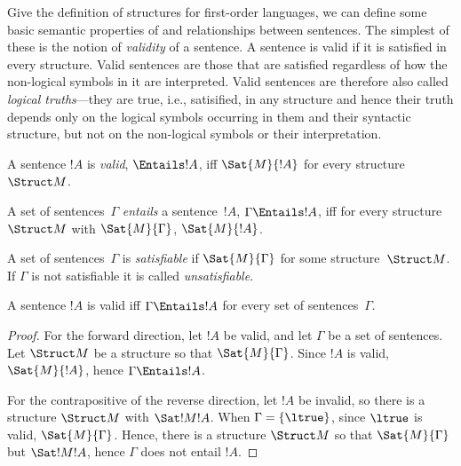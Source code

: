 \documentclass[../../include/open-logic-section]{subfiles}
\begin{document}

\begin{explain}
Give the definition of structures for first-order languages, we can
define some basic semantic properties of and relationships between
sentences.  The simplest of these is the notion of \emph{validity} of
a sentence.  A sentence is valid if it is satisfied in every
structure.  Valid sentences are those that are satisfied regardless of
how the non-logical symbols in it are interpreted.  Valid sentences
are therefore also called \emph{logical truths}---they are true, i.e.,
satisified, in any structure and hence their truth depends only on the
logical symbols occurring in them and their syntactic structure, but not
on the non-logical symbols or their interpretation.  
\end{explain}

\begin{defn}[Validity]
A sentence $!A$ is \emph{valid}, $\Entails !A$, iff $\Sat{M}{!A}$ for every
structure~$\Struct M$.
\end{defn}

\begin{defn}[Entailment]
A set of sentences~$\Gamma$ \emph{entails} a sentence~$!A$, $\Gamma
\Entails !A$, iff for every structure~$\Struct M$ with
$\Sat{M}{\Gamma}$, $\Sat{M}{!A}$.
\end{defn}

\begin{defn}[Satisfiability]
A set of sentences~$\Gamma$ is \emph{satisfiable} if $\Sat{M}{\Gamma}$
for some structure~$\Struct M$.  If $\Gamma$ is not satisfiable it is
called \emph{unsatisfiable}.
\end{defn}

\begin{prop}
A sentence $!A$ is valid iff $\Gamma \Entails !A$ for every set of
sentences~$\Gamma$.
\end{prop}

\begin{proof}
For the forward direction, let $!A$ be valid, and let $\Gamma$ be a
set of sentences. Let $\Struct M$ be a structure so that
$\Sat{M}{\Gamma}$. Since $!A$ is valid, $\Sat{M}{!A}$, hence $\Gamma
\Entails !A$.

For the contrapositive of the reverse direction, let $!A$ be invalid,
so there is a structure $\Struct M$ with $\Sat!{M}{!A}$. When $\Gamma
= \{ \ltrue \}$, since $\ltrue$ is valid, $\Sat{M}{\Gamma}$. Hence,
there is a structure $\Struct M$ so that $\Sat{M}{\Gamma}$ but
$\Sat!{M}{!A}$, hence $\Gamma$ does not entail $!A$.
\end{proof}
\end{document}
